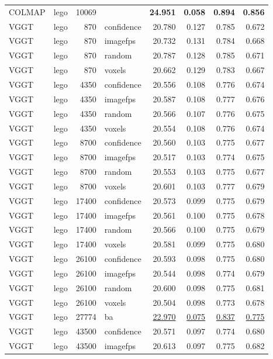 \begin{table}[H]
\begin{tabular}{llrlrrrr}
\midrule
COLMAP & lego & 10069 &  & \textbf{24.951} & \textbf{0.058} & \textbf{0.894} & \textbf{0.856} \\
VGGT & lego & 870 & confidence & 20.780 & 0.127 & 0.785 & 0.672 \\
VGGT & lego & 870 & imagefps & 20.732 & 0.131 & 0.784 & 0.668 \\
VGGT & lego & 870 & random & 20.787 & 0.128 & 0.785 & 0.671 \\
VGGT & lego & 870 & voxels & 20.662 & 0.129 & 0.783 & 0.667 \\
VGGT & lego & 4350 & confidence & 20.556 & 0.108 & 0.776 & 0.674 \\
VGGT & lego & 4350 & imagefps & 20.587 & 0.108 & 0.777 & 0.676 \\
VGGT & lego & 4350 & random & 20.566 & 0.107 & 0.776 & 0.675 \\
VGGT & lego & 4350 & voxels & 20.554 & 0.108 & 0.776 & 0.674 \\
VGGT & lego & 8700 & confidence & 20.560 & 0.103 & 0.775 & 0.677 \\
VGGT & lego & 8700 & imagefps & 20.517 & 0.103 & 0.774 & 0.675 \\
VGGT & lego & 8700 & random & 20.553 & 0.103 & 0.775 & 0.677 \\
VGGT & lego & 8700 & voxels & 20.601 & 0.103 & 0.777 & 0.679 \\
VGGT & lego & 17400 & confidence & 20.573 & 0.099 & 0.775 & 0.679 \\
VGGT & lego & 17400 & imagefps & 20.561 & 0.100 & 0.775 & 0.678 \\
VGGT & lego & 17400 & random & 20.566 & 0.100 & 0.775 & 0.679 \\
VGGT & lego & 17400 & voxels & 20.581 & 0.099 & 0.775 & 0.680 \\
VGGT & lego & 26100 & confidence & 20.593 & 0.098 & 0.775 & 0.680 \\
VGGT & lego & 26100 & imagefps & 20.544 & 0.098 & 0.774 & 0.679 \\
VGGT & lego & 26100 & random & 20.600 & 0.098 & 0.775 & 0.681 \\
VGGT & lego & 26100 & voxels & 20.504 & 0.098 & 0.773 & 0.678 \\
VGGT & lego & 27774 & ba & \underline{22.970} & \underline{0.075} & \underline{0.837} & \underline{0.775} \\
VGGT & lego & 43500 & confidence & 20.571 & 0.097 & 0.774 & 0.680 \\
VGGT & lego & 43500 & imagefps & 20.613 & 0.097 & 0.775 & 0.682 \\

\end{tabular}
\end{table}
